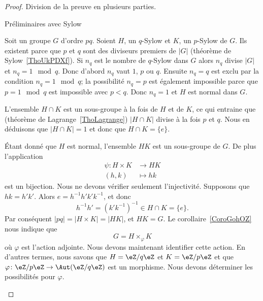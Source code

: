 \begin{proof}
    Division de la preuve en plusieurs parties.
    \begin{subproof}
    \item[Préliminaires avec Sylow]

        Soit un groupe \( G\) d'ordre \( pq\). Soient \( H\), un \( q\)-Sylow et \( K\), un \( p\)-Sylow de \( G\). Ils existent parce que \( p\) et \( q\) sont des diviseurs premiers de \( | G |\) (théorème de Sylow~\ref{ThoUkPDXf}). Si \( n_q\) est le nombre de \( q\)-Sylow dans \( G\) alors \( n_q\) divise \( | G |\) et \( n_q=1\mod q\). Donc d'abord \( n_q\) vaut \( 1\), \( p\) ou \( q\). Ensuite \( n_q=q\) est exclu par la condition \( n_q=1\mod q\); la possibilité \( n_q=p\) est également impossible parce que \( p=1\mod q\) est impossible avec \( p<q\). Donc \( n_q=1\) et \( H\) est normal dans \( G\).

        L'ensemble \( H\cap K\) est un sous-groupe à la fois de \( H\) et de \( K\), ce qui entraine que (théorème de Lagrange~\ref{ThoLagrange}) \( | H\cap K |\) divise à la fois \( p\) et \( q\). Nous en déduisons que \( | H\cap K |=1\) et donc que \( H\cap K=\{ e \}\).

        Étant donné que \( H\) est normal, l'ensemble \( HK\) est un sous-groupe de \( G\). De plus l'application
        \begin{equation}
            \begin{aligned}
                \psi\colon H\times K&\to HK \\
                (h,k)&\mapsto hk
            \end{aligned}
        \end{equation}
        est un bijection. Nous ne devons vérifier seulement l'injectivité. Supposons que \( hk=h'k'\). Alors \( e=h^{-1}h'k'k^{-1}\), et donc
        \begin{equation}
            h^{-1} h'=(k'k^{-1})^{-1}\in H\cap K=\{ e \}.
        \end{equation}
        Par conséquent \( | pq |=| H\times K |=| HK |\), et \( HK=G\). Le corollaire~\ref{CoroGohOZ} nous indique que
        \begin{equation}    \label{EqGjQjFN}
            G=H\times_{\varphi}K
        \end{equation}
        où \( \varphi\) est l'action adjointe. Nous devons maintenant identifier cette action. En d'autres termes, nous savons que \( H=\eZ/q\eZ\) et \( K=\eZ/p\eZ\) et que \( \varphi\colon \eZ/p\eZ\to \Aut(\eZ/q\eZ)\) est un morphisme. Nous devons déterminer les possibilités pour \( \varphi\).


\end{subproof}
\end{proof}
